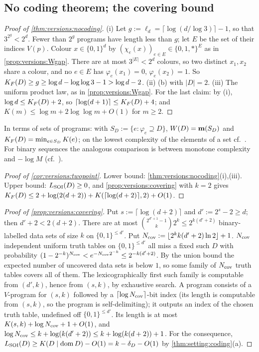 \subsection{No coding theorem; the covering bound}\label{app:versions:nocoding}

\begin{proof}[Proof of \cref{thm:versions:nocoding}]
(i) Let $g:=\ell_d=\lceil\log(d/\log3)\rceil-1$, so that $3^{2^g}<2^d$. Fewer than $2^g$ programs have length less than $g$; let $E$ be the set of their indices $V(p)$. Colour $x\in\{0,1\}^d$ by $(\chi_e(x))_{e\in E}\in\{0,1,*\}^E$ as in \cref{prop:versions:Wgap}. There are at most $3^{|E|}<2^d$ colours, so two distinct $x_1,x_2$ share a colour, and no $e\in E$ has $\varphi_e(x_1)=0$, $\varphi_e(x_2)=1$. So $K_{F}(D)\ge g\ge\log d-\log\log3-1>\log d-2$.
(ii) (b) with $|D|=2$.
(iii) The uniform product law, as in \cref{prop:versions:Wgap}.
For the last claim: by (i), $\log d\le K_{F}(D)+2$, so $\lceil\log(d+1)\rceil\le K_{F}(D)+4$; and $K(m)\le\log m+2\log\log m+O(1)$ for $m\ge2$.
\end{proof}

In terms of sets of programs: with $S_D:=\{e:\varphi_e\supseteq D\}$, $W(D)=\mathbf{m}(S_D)$ and $K_{F}(D)=\min_{e\in S_D}K(e)$; on the lowest complexity of the elements of a set cf.\ \citet{levin2016occam,epstein2011sets}. For binary sequences the analogous comparison is between monotone complexity and $-\log M$ (cf.\ \citealp{gacs1983relation,day2011increasing}).

\begin{proof}[Proof of \cref{cor:versions:twopoint}]
Lower bound: \cref{thm:versions:nocoding}(i),(iii). Upper bound: $L_{\mathrm{SOI}}(D)\ge0$, and \cref{prop:versions:covering} with $k=2$ gives $K_{F}(D)\le2+\log(2(d+2))+K(\lceil\log(d+2)\rceil,2)+O(1)$.
\end{proof}

\begin{proof}[Proof of \cref{prop:versions:covering}]
Put $s:=\lceil\log(d+2)\rceil$ and $d':=2^s-2\ge d$; then $d'+2<2(d+2)$. There are at most $\binom{2^{d'+1}-1}{k}2^k\le2^{k(d'+2)}$ binary-labelled data sets of size $k$ on $\{0,1\}^{\le d'}$. Put $N_{\rm cov}:=\lfloor2^kk(d'+2)\ln2\rfloor+1$. $N_{\rm cov}$ independent uniform truth tables on $\{0,1\}^{\le d'}$ all miss a fixed such $D$ with probability $(1-2^{-k})^{N_{\rm cov}}<e^{-N_{\rm cov}2^{-k}}\le2^{-k(d'+2)}$. By the union bound the expected number of uncovered data sets is below $1$, so some family of $N_{\rm cov}$ truth tables covers all of them. The lexicographically first such family is computable from $(d',k)$, hence from $(s,k)$, by exhaustive search. A program consists of a $V$-program for $(s,k)$ followed by a $\lceil\log N_{\rm cov}\rceil$-bit index (its length is computable from $(s,k)$, so the program is self-delimiting); it outputs an index of the chosen truth table, undefined off $\{0,1\}^{\le d'}$. Its length is at most $K(s,k)+\log N_{\rm cov}+1+O(1)$, and $\log N_{\rm cov}\le k+\log(k(d'+2))\le k+\log(k(d+2))+1$. For the consequence, $L_{\mathrm{SOI}}(D)\ge K(D\mid\operatorname{dom} D)-O(1)=k-\delta_D-O(1)$ by \cref{thm:setting:coding}(a).
\end{proof}

